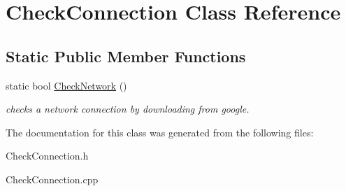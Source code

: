 \hypertarget{classCheckConnection}{}\section{Check\+Connection Class Reference}
\label{classCheckConnection}
\subsection*{Static Public Member Functions}
\begin{DoxyCompactItemize}
\item 
\mbox{\label{classCheckConnection_a1c4c6ce94485bd09f815b238a696527e}} 
static bool \hyperlink{classCheckConnection_a1c4c6ce94485bd09f815b238a696527e}{Check\+Network} ()
\begin{DoxyCompactList}\small\item\em checks a network connection by downloading from google. \end{DoxyCompactList}\end{DoxyCompactItemize}


The documentation for this class was generated from the following files\+:\begin{DoxyCompactItemize}
\item 
Check\+Connection.\+h\item 
Check\+Connection.\+cpp\end{DoxyCompactItemize}
